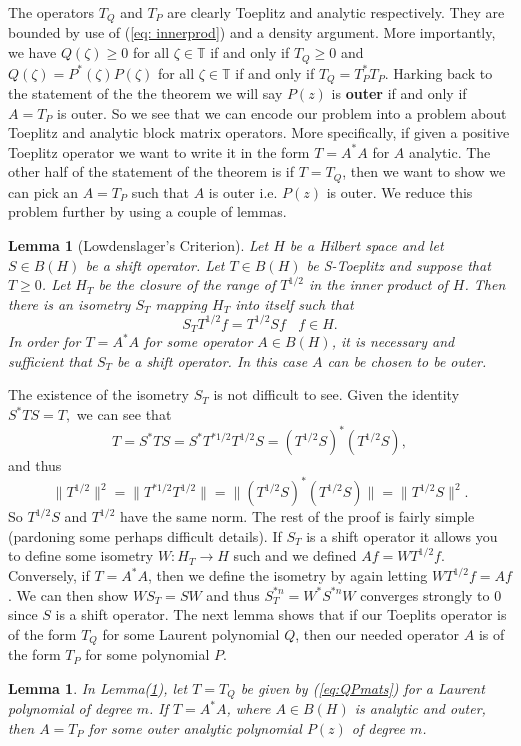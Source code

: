 \documentclass[12 pt]{article}
\theoremstyle{plain}
\newtheorem{lemma}[theorem]{Lemma}
\theoremstyle{definition}
\begin{document}
The operators $T_Q$ and $T_P$ are clearly Toeplitz and analytic respectively. They are bounded by use of (\ref{eq: innerprod}) and a density argument. More importantly, we have $Q(\zeta)\geq0$ for all $\zeta\in \mathbb{T}$ if and only if $T_Q\geq 0$ and $Q(\zeta)=P^*(\zeta)P(\zeta)$ for all $\zeta\in \mathbb{T}$ if and only if $T_Q=T_P^*T_P$. Harking back to the statement of the the theorem we will say $P(z)$ is {\bf outer} if and only if $A=T_P$ is outer. So we see that we can encode our problem into a problem about Toeplitz and analytic block matrix operators. More specifically, if given a positive Toeplitz operator we want to write it in the form $T=A^*A$ for $A$ analytic. The other half of the statement of the theorem is if $T=T_Q$, then we want to show we can pick an $A=T_P$ such that $A$ is outer i.e. $P(z)$ is outer. We reduce this problem further by using a couple of lemmas. 
\begin{lemma}[Lowdenslager's Criterion]\label{Lowdenslagers_Crit}
Let $H$ be a Hilbert space and let $S\in B(H)$ be a shift operator. Let $T\in B(H)$ be S-Toeplitz and suppose that $T\geq 0$. Let $H_T$ be the closure of the range of $T^{1/2}$ in the inner product of $H$. Then there is an isometry $S_T$ mapping $H_T$ into itself such that 
\[S_TT^{1/2}f=T^{1/2}Sf \ \ \ \ f\in H.\]
In order for $T=A^*A$ for some operator $A\in B(H)$, it is necessary and sufficient that $S_T$ be a shift operator. In this case $A$ can be chosen to be outer. 
\end{lemma}
The existence of the isometry $S_T$ is not difficult to see. Given the identity $S^*TS=T,$ we can see that 
\[T=S^*TS=S^*T^{*1/2}T^{1/2}S=(T^{1/2}S)^*(T^{1/2}S),\]
and thus
\[\|T^{1/2}\|^2=\|T^{*1/2}T^{1/2}\|=\|(T^{1/2}S)^*(T^{1/2}S)\|=\|T^{1/2}S\|^2.\]
So $T^{1/2}S$ and $T^{1/2}$ have the same norm. The rest of the proof is fairly simple (pardoning some perhaps difficult details). If $S_T$ is a shift operator it allows you to define some isometry $W:H_T\rightarrow H$ such and we defined $Af=WT^{1/2}f$. Conversely, if $T=A^*A$, then we define the isometry by again letting $WT^{1/2}f=Af$.  We can then show $WS_T=SW$ and thus $S_T^{*n}=W^*S^{*n}W$ converges strongly to 0 since $S$ is a shift operator. The next lemma shows that if our Toeplits operator is of the form $T_Q$ for some Laurent polynomial $Q$, then our needed operator $A$ is of the form $T_P$ for some polynomial $P$. 
\begin{lemma}
In Lemma(\ref{Lowdenslagers_Crit}), let $T=T_Q$ be given by (\ref{eq:QPmats}) for a Laurent polynomial of degree $m$. If $T=A^*A$, where $A\in B(H)$ is analytic and outer, then $A=T_P$ for some outer analytic polynomial $P(z)$ of degree $m$.
\end{lemma}
\end{document}
